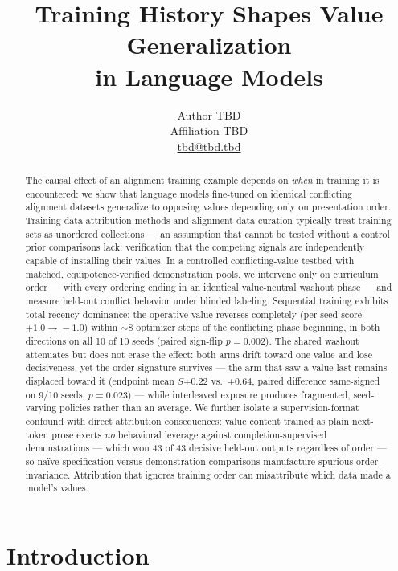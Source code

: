 \documentclass{article}
\title{Training History Shapes Value Generalization\\in Language Models}
\author{
    Author TBD \\
    Affiliation TBD \\
    \href{mailto:tbd@tbd.tbd}{tbd@tbd.tbd}
}
\newcommand{\score}{$S$\xspace}
\begin{document}
\maketitle

\begin{abstract}
The causal effect of an alignment training example depends on \emph{when} in training
it is encountered: we show that language models fine-tuned on identical conflicting
alignment datasets generalize to opposing values depending only on presentation order.
Training-data attribution methods and alignment data curation typically treat training
sets as unordered collections --- an assumption that cannot be tested without a control
prior comparisons lack: verification that the competing signals are independently
capable of installing their values. In a controlled conflicting-value testbed with
matched, equipotence-verified demonstration pools, we intervene only on curriculum
order --- with every ordering ending in an identical value-neutral washout phase --- and
measure held-out conflict behavior under blinded labeling. Sequential training exhibits
total recency dominance: the operative value reverses completely (per-seed score
$+1.0\!\to\!-1.0$) within ${\sim}8$ optimizer steps of the conflicting phase beginning,
in both directions on all 10 of 10 seeds (paired sign-flip $p{=}0.002$).
The shared washout attenuates but does not erase the effect: both arms drift toward
one value and lose decisiveness, yet the order signature survives --- the arm that saw
a value last remains displaced toward it (endpoint mean \score $+0.22$ vs.\ $+0.64$,
paired difference same-signed on 9/10 seeds, $p{=}0.023$) --- while interleaved
exposure produces fragmented, seed-varying policies rather than an average.
We further isolate a supervision-format confound with direct attribution consequences:
value content trained as plain next-token prose exerts \emph{no} behavioral leverage
against completion-supervised demonstrations --- which won 43 of 43 decisive held-out
outputs regardless of order --- so na\"ive specification-versus-demonstration
comparisons manufacture spurious order-invariance. Attribution that ignores training
order can misattribute which data made a model's values.
\end{abstract}

\section{Introduction}
\end{document}
